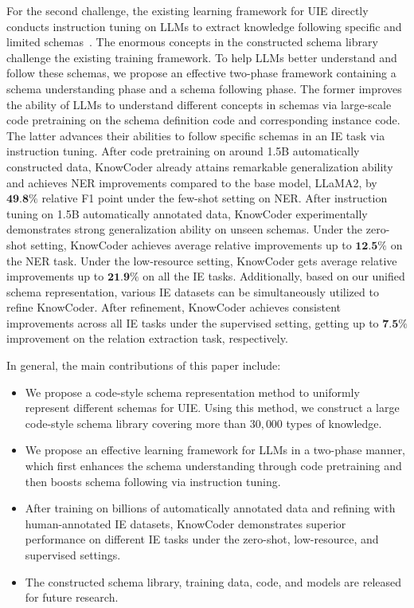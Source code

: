 For the second challenge, the existing learning framework for UIE directly
conducts instruction tuning on LLMs to extract knowledge following specific and
limited schemas~\cite{sainz2023gollie,wang2023instructuie}. The enormous
concepts in the constructed schema library challenge the existing training
framework. To help LLMs better understand and follow these schemas, we propose
an effective two-phase framework containing a schema understanding phase and a
schema following phase. The former improves the ability of LLMs to understand
different concepts in schemas via large-scale code pretraining on the schema
definition code and corresponding instance code. The latter advances their
abilities to follow specific schemas in an IE task via instruction tuning. After code pretraining on around 1.5B automatically constructed data, KnowCoder already attains remarkable generalization ability and achieves NER improvements compared to the base model, LLaMA2, by $\textbf{49.8\%}$ relative F1 point under the few-shot setting on NER. After instruction tuning on 1.5B automatically annotated data,  KnowCoder experimentally demonstrates strong generalization ability on unseen schemas. Under the zero-shot setting,  KnowCoder achieves average relative improvements up to $\textbf{12.5\%}$ on  the NER task. Under the low-resource setting, KnowCoder gets average relative improvements up to $\textbf{21.9\%}$ on all the IE tasks. Additionally, based on our unified schema representation, various IE datasets can be simultaneously utilized to refine KnowCoder. After refinement, KnowCoder achieves consistent improvements across all IE tasks under the supervised setting, getting up to $\textbf{7.5\%}$ improvement on the relation extraction task, respectively. 

In general, the main contributions of this paper include: 
\begin{itemize}
  \item We propose a code-style schema representation method to uniformly
  represent different schemas for UIE. Using this method, we construct a large
  code-style schema library covering more than $30,000$ types of knowledge.
  \item We propose an effective learning framework for LLMs in a two-phase
  manner, which first enhances the schema understanding through code pretraining
  and then boosts schema following via instruction tuning. 
  \item After training on billions of automatically annotated data and refining
  with human-annotated IE datasets, KnowCoder demonstrates superior performance
  on different IE tasks under the zero-shot, low-resource, and supervised
  settings.
  \item The constructed schema library, training data, code, and models are released for future research.
\end{itemize}

